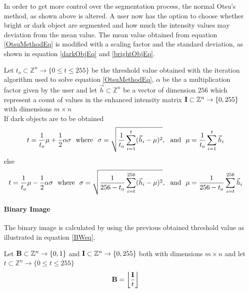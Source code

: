 \documentclass[11pt,fleqn,,a4paper,twoside,openright]{book}
\begin{document}
In order to get more control over the segmentation process, the normal Otsu's method, as shown above is altered. A user now has the option to choose whether bright or dark object are segmented and how much the intensity values may deviation from the mean value. The mean value obtained from equation \ref{OtsuMethodEq} is modified with a scaling factor and the standard deviation, as shown in equation \ref{darkObjEq} and \ref{brightObjEq}.
\begin{sBox}
	Let $ t_o \subset \mathbb{Z}^n \rightarrow \{0\leq t \leq 255\}$ be the threshold value obtained with the iteration algorithm used to solve equation \ref{OtsuMethodEq}, $ \alpha $ be the a multiplication factor given by the user and let $\vec{h} \subset \mathbb{Z}^n$ be a vector of dimension $256$ which represent a count of values in the enhanced intensity matrix $\mat{I} \subset \mathbb{Z}^n \rightarrow \{0, 255\}$ with dimensions $m \times n$\\	
	If dark objects are to be obtained
	\begin{equation}\label{darkObjEq}
	t = \frac{1}{t_o}\mu + \frac{1}{2}\alpha\sigma {\rm \ \ where\ \ }\sigma = \sqrt{\frac{1}{t_o} \sum\limits_{i=1}^t (\vec{h}_i - \mu)^2}, {\rm \ \ and\ \ } \mu = \frac{1}{t_o} \sum\limits_{i=1}^t \vec{h}_i
	\end{equation}
	else
	\begin{equation}\label{brightObjEq}
	t = \frac{1}{t_o}\mu - \frac{1}{2}\alpha\sigma {\rm \ \ where\ \ }\sigma = \sqrt{\frac{1}{256 - t_o} \sum\limits_{i=t}^{256} (\vec{h}_i - \mu)^2}, {\rm \ \ and\ \ } \mu = \frac{1}{256 - t_o} \sum\limits_{i=t}^{256} \vec{h}_i
	\end{equation} 
\end{sBox}

\paragraph{Binary Image}\label{binaryImage} The binary image is calculated by using the previous obtained threshold value as illustrated in equation \ref{BWeq}.
\begin{sBox}
	Let $\mat{B} \subset \mathbb{Z}^n \rightarrow \{0, 1\}$ and $\mat{I} \subset \mathbb{Z}^n \rightarrow \{0, 255\}$ both with dimensions $ m \times n $ and let $t \subset \mathbb{Z}^n \rightarrow \{0\leq t \leq 255\}$
	\begin{equation}\label{BWeq}
	\mat{B} = \floor*{\frac{\mat{I}}{t}}
	\end{equation}
\end{sBox}
\end{document}

